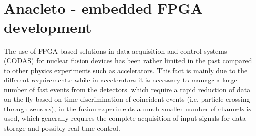



\section{Anacleto - embedded FPGA development}

The use of FPGA-based solutions in data acquisition and control systems (CODAS) for nuclear fusion devices has been rather limited in the past compared to other physics experiments such as accelerators. This fact is mainly due to the different requirements: while in accelerators it is necessary to manage a large number of fast events from the detectors, which require a rapid reduction of data on the fly based on time discrimination of coincident events (i.e. particle crossing through sensors), in the fusion experiments a much smaller number of channels is used, which generally requires the complete acquisition of input signals for data storage and possibly real-time control. 
